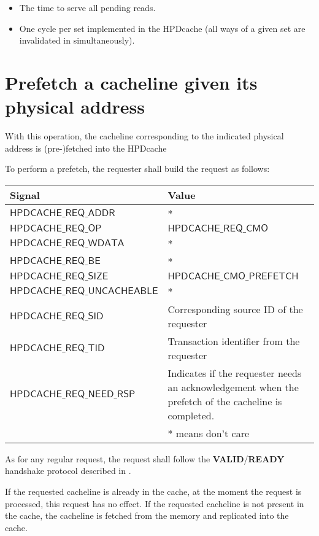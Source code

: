 \documentclass[10pt,titlepage,twoside]{book}
\begin{document}
\begin{itemize}
\item The time to serve all pending reads.
\item One cycle per set implemented in the \ac{HPDcache} (all ways of a given set are invalidated in simultaneously).
\end{itemize}


\newpage
\section{Prefetch a cacheline given its physical address}

With this operation, the cacheline corresponding to the indicated physical address is (pre-)fetched into the \ac{HPDcache}

To perform a prefetch, the requester shall build the request as follows:

{\centering\footnotesize\begin{tabular}{p{.38\linewidth}p{.55\linewidth}}
  \toprule
  \textbf{Signal}
  & \textbf{Value} \\
  \midrule
  $\mathsf{HPDCACHE\_REQ\_ADDR}$
  & *\\
  \midrule
  $\mathsf{HPDCACHE\_REQ\_OP}$
  & $\mathsf{HPDCACHE\_REQ\_CMO}$ \\
  \midrule
  $\mathsf{HPDCACHE\_REQ\_WDATA}$
  & *\\
  \midrule
  $\mathsf{HPDCACHE\_REQ\_BE}$
  & *\\
  \midrule
  $\mathsf{HPDCACHE\_REQ\_SIZE}$
  & $\mathsf{HPDCACHE\_CMO\_PREFETCH}$\\
  \midrule
  $\mathsf{HPDCACHE\_REQ\_UNCACHEABLE}$
  & *\\
  \midrule
  $\mathsf{HPDCACHE\_REQ\_SID}$
  & Corresponding source ID of the requester\\
  \midrule
  $\mathsf{HPDCACHE\_REQ\_TID}$
  & Transaction identifier from the requester\\
  \midrule
  $\mathsf{HPDCACHE\_REQ\_NEED\_RSP}$
  & Indicates if the requester needs an acknowledgement when the prefetch of the cacheline is completed.\\
  \bottomrule
  & * means don't care \\
\end{tabular}}

As for any regular request, the request shall follow the \textbf{VALID}/\textbf{READY} handshake protocol described in .

If the requested cacheline is already in the cache, at the moment the request is processed, this request has no effect. If the requested cacheline is not present in the cache, the cacheline is fetched from the memory and replicated into the cache.
\end{document}
